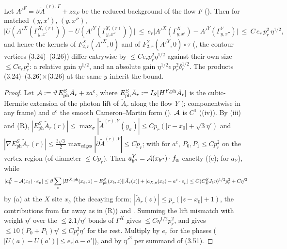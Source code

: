 \begin{lemma}\label{rot:hyb:lem:CV}
Let $A'^F=\vartheta\tilde A^{(r),F}+za_F$ be the reduced background of the flow $F$ (). Then for matched $(y,x')$, $(y,x'')$,
\[
\big|U(A'^X(\Gamma^{X,(r)}_{y,x'}))-U(A'^Y(\Gamma^{Y,(r)}_{y,x''}))\big|\ \le\ e_r\big|A'^X(\Gamma^X_{y,x'})-A'^Y(\Gamma^Y_{y,x''})\big|\ \le\ C\,e_r\,p_r^2\,\eta^{1/2},
\]
and hence the kernels of $F^X_{2,r}(A'^X,0)$ and of $F^Y_{2,r}(A'^Y,0)\circ\tau$ (\cite[(3.51)]{K1}, the contour vertices (3.24)--(3.26)) differ entrywise by $\le Ce_rp_r^2\eta^{1/2}$ against their own size $\le Ce_rp_r^2$: a relative gain $\eta^{1/2}$, and an absolute gain $\eta^{1/2}e\,p_r^2\delta_r^{1/2}$. The products (3.24)--(3.26)$\times$(3.26) at the same $y$ inherit the bound.
\end{lemma}
\begin{proof}
Let $\mathcal A:=\vartheta\,E^S_{\mathrm{ph}}\tilde A_r+za^{\mathrm c}$, where $E^S_{\mathrm{ph}}\tilde A_r:= I_S[H^{Y,\mathrm{ph}}\tilde A_r]$ is the cubic-Hermite extension of the photon lift of $\tilde A_r$ along the flow $Y$ (; componentwise in any frame) and $a^{\mathrm c}$ the smooth Cameron--Martin form (). $\mathcal A$ is $C^1$ ((iv)). By (iii) and (R), $|E^S_{\mathrm{ph}}\tilde A_r(r)|\le\max_\sigma|\tilde A^{(r),Y}(y_\sigma)|\le Cp_r(|r-x_0|+\sqrt3\eta')$ and $|\nabla E^S_{\mathrm{ph}}\tilde A_r(r)|\le\frac{3\sqrt3}2\max_{\mathrm{edges}}|\partial\tilde A^{(r),Y}|\le Cp_r$; with  for $a^{\mathrm c}$, $P_0,P_1\le Cp_r^2$ on the vertex region (of diameter $\le Cp_r$). Then $a^Y_{b''}=\mathcal A(x_{b''})\cdot f_\alpha$ exactly ((c);  for $a_Y$), while
\[
|a^X_b-\mathcal A(x_b)\cdot e_\mu|\le\vartheta\sum_z|H^{X,\mathrm{ph}}(x_b,z)-E^S_{\mathrm{ph}}(x_b,z)||\tilde A_r(z)|+|a_{X,\mu}(x_b)-a^{\mathrm c}\cdot e_\mu|\le C(C^S_EJ_1\eta)^{1/2}p_r^2+C\eta'^2
\]
by (a) at the $X$ site $x_b$ (the decaying form; $|\tilde A_r(z)|\le p_r(|z-x_0|+1)$, the contributions from far away as in (R)) and . Summing the lift mismatch with weight $\eta'$ over the $\le2.1/\eta'$ bonds of $\Gamma^X$ gives $\le C\eta^{1/2}p_r^2$, and  gives $\le10(P_0+P_1)\eta'\le Cp_r^2\eta'$ for the rest. Multiply by $e_r$ for the phases ($|U(a)-U(a')|\le e_r|a-a'|$), and by $\eta'^3$ per summand of (3.51).
\end{proof}

